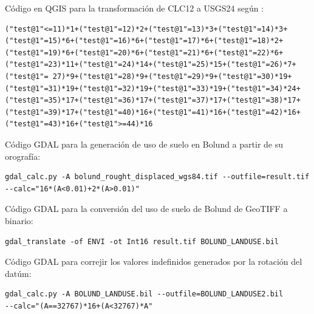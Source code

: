 Código en QGIS para la transformación de CLC12 a USGS24 según \cite{Pineda2004}:
\lstset{style=consola}
\begin{lstlisting}
("test@1"<=11)*1+("test@1"=12)*2+("test@1"=13)*3+("test@1"=14)*3+
("test@1"=15)*6+("test@1"=16)*6+("test@1"=17)*6+("test@1"=18)*2+
("test@1"=19)*6+("test@1"=20)*6+("test@1"=21)*6+("test@1"=22)*6+
("test@1"=23)*11+("test@1"=24)*14+("test@1"=25)*15+("test@1"=26)*7+
("test@1"= 27)*9+("test@1"=28)*9+("test@1"=29)*9+("test@1"=30)*19+
("test@1"=31)*19+("test@1"=32)*19+("test@1"=33)*19+("test@1"=34)*24+
("test@1"=35)*17+("test@1"=36)*17+("test@1"=37)*17+("test@1"=38)*17+
("test@1"=39)*17+("test@1"=40)*16+("test@1"=41)*16+("test@1"=42)*16+
("test@1"=43)*16+("test@1">=44)*16
\end{lstlisting}
Código GDAL para la generación de uso de suelo en Bolund a partir de su orografía:
\begin{lstlisting}
gdal_calc.py -A bolund_rought_displaced_wgs84.tif --outfile=result.tif 
--calc="16*(A<0.01)+2*(A>0.01)"
\end{lstlisting}
Código GDAL para la conversión del uso de suelo de Bolund de GeoTIFF a binario:
\begin{lstlisting}
gdal_translate -of ENVI -ot Int16 result.tif BOLUND_LANDUSE.bil
\end{lstlisting}
Código GDAL para correjir los valores indefinidos generados por la rotación del datúm:
\begin{lstlisting}
gdal_calc.py -A BOLUND_LANDUSE.bil --outfile=BOLUND_LANDUSE2.bil 
--calc="(A==32767)*16+(A<32767)*A"
\end{lstlisting}

